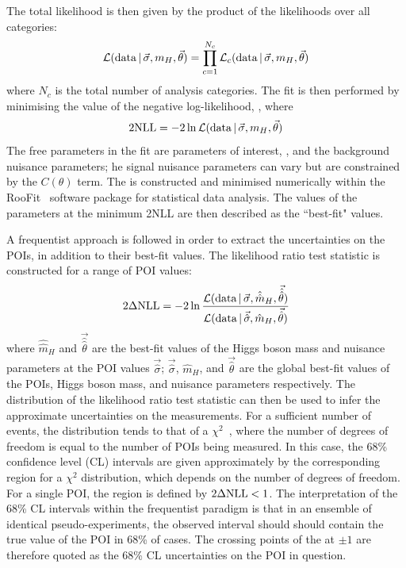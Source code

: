 The total likelihood \Like is then given by the product of the likelihoods over all categories:
\begin{equation}
\mathcal{L}(\textrm{data}\,|\,\vec{\sigma},m_{H},\vec{\theta}) = \prod^{N_c}_{c=1} \mathcal{L}_c(\textrm{data}\,|\,\vec{\sigma},m_{H},\vec{\theta})
\end{equation}
where $N_c$ is the total number of analysis categories.
The fit is then performed by minimising the value of the negative log-likelihood, \NLL, where
\begin{equation}
2\textrm{NLL} = -2\ln\mathcal{L}(\textrm{data}\,|\,\vec{\sigma},m_{H},\vec{\theta})
\end{equation}
The free parameters in the fit are parameters of interest, \mH, and the background nuisance parameters;
he signal nuisance parameters can vary but are constrained by the $C(\theta)$ term.
The \NLL is constructed and minimised numerically within the RooFit~\cite{RooFit} 
software package for statistical data analysis.
The values of the parameters at the minimum 2NLL are then described as the ``best-fit" values.

A frequentist approach is followed in order to extract the uncertainties on the POIs, 
in addition to their best-fit values.
The likelihood ratio test statistic is constructed for a range of POI values:
\begin{equation}
2\Delta\textrm{NLL} = -2\ln\frac{ \mathcal{L}(\textrm{data}\,|\,\vec{\sigma},\hat{\hat{m}}_H,\vec{\hat{\hat{\theta}}}) }
                  { \mathcal{L}(\textrm{data}\,|\,\vec{\hat{\sigma}},\hat{m}_H,\vec{\hat{\theta}}) }
\end{equation}
where $\hat{\hat{m}}_H$ and $\vec{\hat{\hat{\theta}}}$ are the best-fit values 
of the Higgs boson mass and nuisance parameters at the POI values $\vec{\hat{\sigma}}$;
$\vec{\hat{\sigma}}$, $\hat{m}_H$, and $\vec{\hat{\theta}}$ are the global best-fit values 
of the POIs, Higgs boson mass, and nuisance parameters respectively.
The distribution of the likelihood ratio test statistic 
can then be used to infer the approximate uncertainties on the measurements.
For a sufficient number of events, %
the distribution tends to that of a $\chi^2$~\cite{Asymptotic}, 
where the number of degrees of freedom is equal to the number of POIs being measured.
In this case, the 68\% confidence level (CL) intervals 
are given approximately by the corresponding region for a $\chi^2$ distribution, 
which depends on the number of degrees of freedom.
For a single POI, the region is defined by $2\Delta\textrm{NLL} < 1$.
The interpretation of the 68\% CL intervals within the frequentist paradigm 
is that in an ensemble of identical pseudo-experiments, 
the observed interval should should contain the true value of the POI in 68\% of cases.
The crossing points of the \dNLL at $\pm 1$ are therefore quoted
as the 68\% CL uncertainties on the POI in question.


